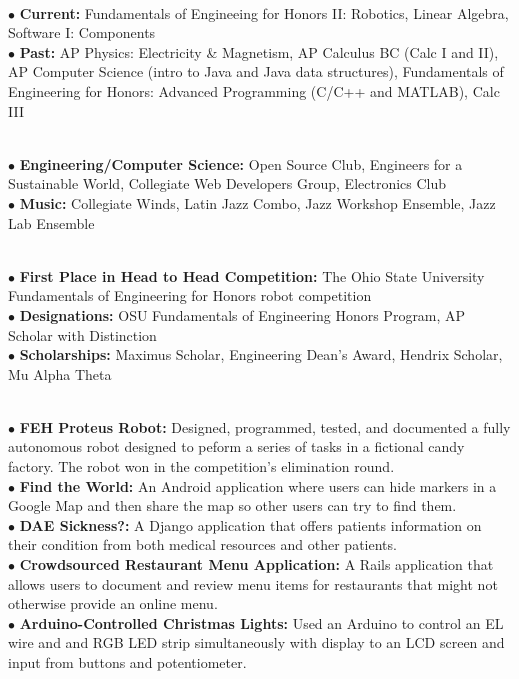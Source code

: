 \documentclass[10pt]{article}
\begin{document}
\\
\smallskip
$\bullet$ {\bf Current:} Fundamentals of Engineeing for Honors II: Robotics, Linear Algebra, Software I: Components\\
$\bullet$ {\bf Past:} AP Physics: Electricity \& Magnetism, AP Calculus BC (Calc I and II), AP Computer Science (intro to Java and Java data structures), Fundamentals of Engineering for Honors: Advanced Programming (C/C++ and MATLAB), Calc III
\medskip

\\
\smallskip
$\bullet$ {\bf Engineering/Computer Science:} Open Source Club, Engineers for a Sustainable World, Collegiate Web Developers Group, Electronics Club\\
$\bullet$ {\bf Music:} Collegiate Winds, Latin Jazz Combo, Jazz Workshop Ensemble, Jazz Lab Ensemble
\medskip

\\
\smallskip
$\bullet$ {\bf First Place in Head to Head Competition:} The Ohio State University Fundamentals of Engineering for Honors robot competition\\
$\bullet$ {\bf Designations:} OSU Fundamentals of Engineering Honors Program, AP Scholar with Distinction\\
$\bullet$ {\bf Scholarships:} Maximus Scholar, Engineering Dean's Award, Hendrix Scholar, Mu Alpha Theta
\medskip

\\
\smallskip
$\bullet$ {\bf FEH Proteus Robot:} Designed, programmed, tested, and documented a fully autonomous robot designed to peform a series of tasks in a fictional candy factory. The robot won in the competition's elimination round.\\
$\bullet$ {\bf Find the World:} An Android application where users can hide markers in a Google Map and then share the map so other users can try to find them.\\
$\bullet$ {\bf DAE Sickness?:} A Django application that offers patients information on their condition from both medical resources and other patients.\\
$\bullet$ {\bf Crowdsourced Restaurant Menu Application:} A Rails application that allows users to document and review menu items for restaurants that might not otherwise provide an online menu.\\
$\bullet$ {\bf Arduino-Controlled Christmas Lights:} Used an Arduino to control an EL wire and and RGB LED strip simultaneously with display to an LCD screen and input from buttons and potentiometer.
\medskip
\end{document}
